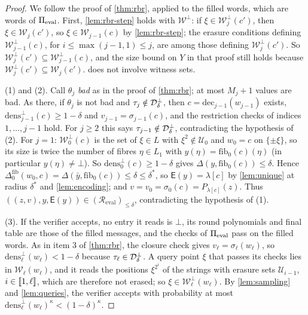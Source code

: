 \begin{proof}
We follow the proof of \cref{thm:rbr}, applied to the filled words, which are words of $\Pi_{\mathrm{eval}}$.
First, \cref{lem:rbr-step} holds with $\mathcal{W}^{\bot}$: if $\xi \in \mathcal{W}^{\bot}_j(c')$, then $\xi \in \mathcal{W}_j(c')$, so $\xi \in \mathcal{W}_{j-1}(c)$ by \cref{lem:rbr-step}; the erasure conditions defining $\mathcal{W}^{\bot}_{j-1}(c)$, for $i \le \max(j-1,1) \le j$, are among those defining $\mathcal{W}^{\bot}_{j}(c')$. So $\mathcal{W}^{\bot}_j(c') \subseteq \mathcal{W}^{\bot}_{j-1}(c)$, and the size bound on $Y$ in that proof still holds because $\mathcal{W}^{\bot}_j(c') \subseteq \mathcal{W}_j(c')$.
 does not involve witness sets.

(1) and (2). Call $\theta_j$ \emph{bad} as in the proof of \cref{thm:rbr}; at most $M_j + 1$ values are bad. As there, if $\theta_j$ is not bad and $\tau_j \notin \mathcal{D}^{\bot}_\delta$, then $c = \mathrm{dec}_{j-1}(w_{j-1})$ exists, $\mathrm{dens}^{\bot}_{j-1}(c) \ge 1-\delta$ and $v_{j-1} = \sigma_{j-1}(c)$, and the restriction checks of indices $1, \dots, j-1$ hold.
For $j \ge 2$ this says $\tau_{j-1} \notin \mathcal{D}^{\bot}_\delta$, contradicting the hypothesis of (2).
For $j = 1$: $\mathcal{W}^{\bot}_0(c)$ is the set of $\xi \in L$ with $\xi^2 \notin \mathcal{U}_0$ and $w_0 = c$ on $\{\pm\xi\}$, so its size is twice the number of fibres $\eta \in L_1$ with $y(\eta) = \mathrm{fib}_0(c)(\eta)$ (in particular $y(\eta) \ne \bot$). So $\mathrm{dens}^{\bot}_0(c) \ge 1-\delta$ gives $\Delta(y, \mathrm{fib}_0(c)) \le \delta$.
Hence $\Delta^{\mathrm{fib}}_0(w_0, c) = \Delta(\bar y, \mathrm{fib}_0(c)) \le \delta \le \delta^*$, so $\mathsf{E}(y) = \lambda[c]$ by \cref{lem:unique} at radius $\delta^*$ and \cref{lem:encoding}; and $v = v_0 = \sigma_0(c) = P_{\lambda[c]}(z)$. Thus $((z,v), y, \mathsf{E}(y)) \in (\mathcal{R}_{\mathrm{eval}})_{\le\delta}$, contradicting the hypothesis of (1).

(3). If the verifier accepts, no entry it reads is $\bot$, its round polynomials and final table are those of the filled messages, and the checks of $\Pi_{\mathrm{eval}}$ pass on the filled words. As in item 3 of \cref{thm:rbr}, the closure check gives $v_\ell = \sigma_\ell(w_\ell)$, so $\mathrm{dens}^{\bot}_\ell(w_\ell) < 1-\delta$ because $\tau_\ell \in \mathcal{D}^{\bot}_\delta$.
A query point $\xi$ that passes its checks lies in $\mathcal{W}_\ell(w_\ell)$, and it reads the positions $\xi^{2^{i}}$ of the strings with erasure sets $\mathcal{U}_{i-1}$, $i \in \llbracket 1, \ell \rrbracket$, which are therefore not erased; so $\xi \in \mathcal{W}^{\bot}_\ell(w_\ell)$.
By \cref{lem:sampling} and \cref{lem:queries}, the verifier accepts with probability at most $\mathrm{dens}^{\bot}_\ell(w_\ell)^\kappa < (1-\delta)^\kappa$.
\end{proof}

